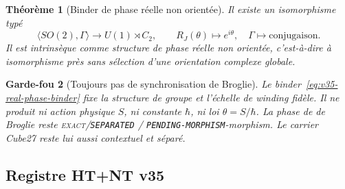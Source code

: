 \documentclass[11pt,a4paper]{article}
\newtheorem{theorem}{Théorème}[section]
\newtheorem{guardrail}[theorem]{Garde-fou}
\newcommand{\statusExact}{\textsc{exact}}
\newcommand{\certSeparated}{\texttt{SEPARATED}}
\newcommand{\certPending}{\texttt{PENDING-MORPHISM}}
\begin{document}
\begin{theorem}[Binder de phase r\'eelle non orient\'ee]\label{thm:v35-real-phase-binder}
Il existe un isomorphisme typ\'e
\begin{equation}\label{eq:v35-real-phase-binder}
 \boxed{
 \langle SO(2),\Gamma\rangle
 \longrightarrow
 U(1)\rtimes C_2,
 \qquad
 R_J(\theta)\mapsto e^{i\theta},\quad
 \Gamma\mapsto\text{conjugaison}.
 }
\end{equation}
Il est intrins\`eque comme \emph{structure de phase r\'eelle non orient\'ee}, c'est-\`a-dire \`a
isomorphisme pr\`es sans s\'election d'une orientation complexe globale.
\end{theorem}

\begin{guardrail}[Toujours pas de synchronisation de Broglie]
Le binder~\eqref{eq:v35-real-phase-binder} fixe la structure de groupe et l'\'echelle de winding
fid\`ele. Il ne produit ni action physique $S$, ni constante $\hbar$, ni loi
$\theta=S/\hbar$. La phase de de Broglie reste
\statusExact{}/\certSeparated{} / \certPending{}-morphism. Le carrier Cube27 reste lui aussi
contextuel et s\'epar\'e.
\end{guardrail}

\subsection{Registre HT+NT v35}
\end{document}
